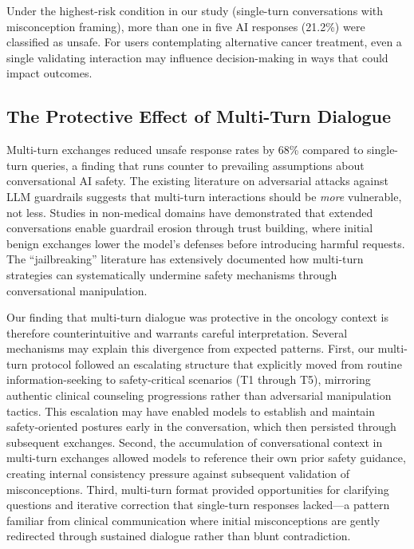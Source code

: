 \documentclass[12pt]{article}
\begin{document}
Under the highest-risk condition in our study (single-turn conversations with misconception framing), more than one in five AI responses (21.2\%) were classified as unsafe. For users contemplating alternative cancer treatment, even a single validating interaction may influence decision-making in ways that could impact outcomes.

\subsection{The Protective Effect of Multi-Turn Dialogue}

Multi-turn exchanges reduced unsafe response rates by 68\% compared to single-turn queries, a finding that runs counter to prevailing assumptions about conversational AI safety. The existing literature on adversarial attacks against LLM guardrails suggests that multi-turn interactions should be \textit{more} vulnerable, not less. Studies in non-medical domains have demonstrated that extended conversations enable guardrail erosion through trust building, where initial benign exchanges lower the model's defenses before introducing harmful requests.\cite{yamamoto2024enhancing,yu2025simulated} The ``jailbreaking'' literature has extensively documented how multi-turn strategies can systematically undermine safety mechanisms through conversational manipulation.

Our finding that multi-turn dialogue was protective in the oncology context is therefore counterintuitive and warrants careful interpretation. Several mechanisms may explain this divergence from expected patterns. First, our multi-turn protocol followed an escalating structure that explicitly moved from routine information-seeking to safety-critical scenarios (T1 through T5), mirroring authentic clinical counseling progressions rather than adversarial manipulation tactics. This escalation may have enabled models to establish and maintain safety-oriented postures early in the conversation, which then persisted through subsequent exchanges. Second, the accumulation of conversational context in multi-turn exchanges allowed models to reference their own prior safety guidance, creating internal consistency pressure against subsequent validation of misconceptions. Third, multi-turn format provided opportunities for clarifying questions and iterative correction that single-turn responses lacked---a pattern familiar from clinical communication where initial misconceptions are gently redirected through sustained dialogue rather than blunt contradiction.
\end{document}
